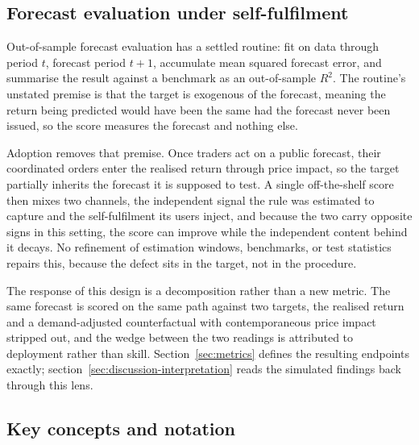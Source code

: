 \documentclass[12pt]{article}
\begin{document}
\subsection{Forecast evaluation under self-fulfilment}

Out-of-sample forecast evaluation has a settled routine: fit on data through period $t$, forecast period $t+1$, accumulate mean squared forecast error, and summarise the result against a benchmark as an out-of-sample $R^{2}$. The routine's unstated premise is that the target is exogenous of the forecast, meaning the return being predicted would have been the same had the forecast never been issued, so the score measures the forecast and nothing else. %

Adoption removes that premise. Once traders act on a public forecast, their coordinated orders enter the realised return through price impact, so the target partially inherits the forecast it is supposed to test. A single off-the-shelf score then mixes two channels, the independent signal the rule was estimated to capture and the self-fulfilment its users inject, and because the two carry opposite signs in this setting, the score can improve while the independent content behind it decays. No refinement of estimation windows, benchmarks, or test statistics repairs this, because the defect sits in the target, not in the procedure. %

The response of this design is a decomposition rather than a new metric. The same forecast is scored on the same path against two targets, the realised return and a demand-adjusted counterfactual with contemporaneous price impact stripped out, and the wedge between the two readings is attributed to deployment rather than skill. Section~\ref{sec:metrics} defines the resulting endpoints exactly; section~\ref{sec:discussion-interpretation} reads the simulated findings back through this lens. %

\subsection{Key concepts and notation}
\end{document}
